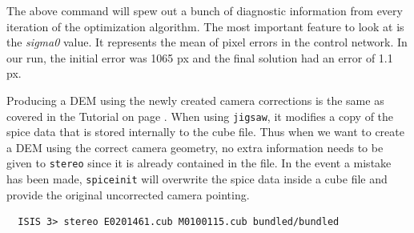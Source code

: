The above command will spew out a bunch of diagnostic information from
every iteration of the optimization algorithm. The most important
feature to look at is the \textit{sigma0} value. It represents the mean of
pixel errors in the control network. In our run, the initial error was
1065 px and the final solution had an error of 1.1 px.

Producing a DEM using the newly created camera corrections is the same
as covered in the Tutorial on page \pageref{ch:moc_tutorial}. When using
\texttt{jigsaw}, it modifies a copy of the spice data that is stored
internally to the cube file. Thus when we want to create a DEM using
the correct camera geometry, no extra information needs to be given to
\texttt{stereo} since it is already contained in the file. In the
event a mistake has been made, \texttt{spiceinit} will overwrite the
spice data inside a cube file and provide the original uncorrected
camera pointing.

\begin{verbatim}
  ISIS 3> stereo E0201461.cub M0100115.cub bundled/bundled
\end{verbatim}





